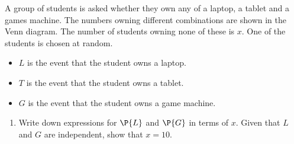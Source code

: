 \clearpage
\begin{problem}
    \begin{center}
    \end{center}

    A group of students is asked whether they own any of a laptop, a tablet and a games machine. The numbers owning different combinations are shown in the Venn diagram. The number of students owning none of these is $x$. One of the students is chosen at random.
    
    \begin{itemize}
        \item $L$ is the event that the student owns a laptop.
        \item $T$ is the event that the student owns a tablet.
        \item $G$ is the event that the student owns a game machine.
    \end{itemize}

    \begin{enumerate}
        \item Write down expressions for $\P{L}$ and $\P{G}$ in terms of $x$. Given that $L$ and $G$ are independent, show that $x = 10$.
    \end{enumerate}


\end{problem}
